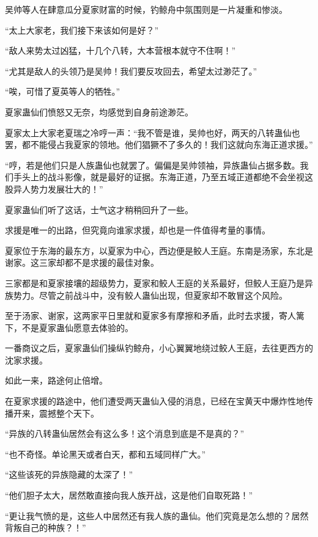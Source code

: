 
\begin{this_body}

吴帅等人在肆意瓜分夏家财富的时候，钓鲸舟中氛围则是一片凝重和惨淡。

“太上大家老，我们接下来该如何是好？”

“敌人来势太过凶猛，十几个八转，大本营根本就守不住啊！”

“尤其是敌人的头领乃是吴帅！我们要反攻回去，希望太过渺茫了。”

“唉，可惜了夏英等人的牺牲。”

夏家蛊仙们愤怒又无奈，均感觉到自身前途渺茫。

夏家太上大家老夏瑞之冷哼一声：“我不管是谁，吴帅也好，两天的八转蛊仙也罢，都不能侵占我夏家的领地。他们猖獗不了多久的！我们这就向东海正道求援。”

“哼，若是他们只是人族蛊仙也就罢了。偏偏是吴帅领袖，异族蛊仙占据多数。我们手头上的战斗影像，就是最好的证据。东海正道，乃至五域正道都绝不会坐视这股异人势力发展壮大的！”

夏家蛊仙们听了这话，士气这才稍稍回升了一些。

求援是唯一的出路，但究竟向谁家求援，却也是一件值得考量的事情。

夏家位于东海的最东方，以夏家为中心，西边便是鲛人王庭。东南是汤家，东北是谢家。这三家却都不是求援的最佳对象。

三家都是和夏家接壤的超级势力，夏家和鲛人王庭的关系最好，但鲛人王庭乃是异族势力。尽管之前战斗中，没有鲛人蛊仙出现，但夏家却不敢冒这个风险。

至于汤家、谢家，这两家平日里就和夏家多有摩擦和矛盾，此时去求援，寄人篱下，不是夏家蛊仙愿意去体验的。

一番商议之后，夏家蛊仙们操纵钓鲸舟，小心翼翼地绕过鲛人王庭，去往更西方的沈家求援。

如此一来，路途何止倍增。

在夏家求援的路途中，他们遭受两天蛊仙入侵的消息，已经在宝黄天中爆炸性地传播开来，震撼整个天下。

“异族的八转蛊仙居然会有这么多！这个消息到底是不是真的？”

“也不奇怪。单论黑天或者白天，都和五域同样广大。”

“这些该死的异族隐藏的太深了！”

“他们胆子太大，居然敢直接向我人族开战，这是他们自取死路！”

“更让我气愤的是，这些人中居然还有我人族的蛊仙。他们究竟是怎么想的？居然背叛自己的种族？！”


\end{this_body}
